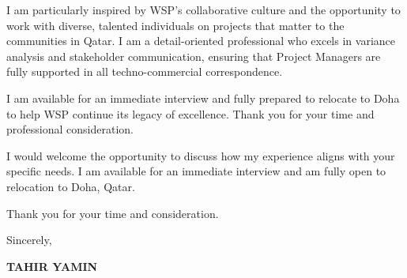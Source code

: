 \documentclass[11pt,a4paper]{article}
\begin{document}
I am particularly inspired by WSP’s collaborative culture and the opportunity to work with diverse, talented individuals on projects that matter to the communities in Qatar. I am a detail-oriented professional who excels in variance analysis and stakeholder communication, ensuring that Project Managers are fully supported in all techno-commercial correspondence.

I am available for an immediate interview and fully prepared to relocate to Doha to help WSP continue its legacy of excellence. Thank you for your time and professional consideration.

I would welcome the opportunity to discuss how my experience aligns with your specific needs. I am available for an immediate interview and am fully open to relocation to Doha, Qatar.

Thank you for your time and consideration.

\vspace{0.5cm}
Sincerely,

\vspace{0.5cm}
\textbf{TAHIR YAMIN}
\end{document}

